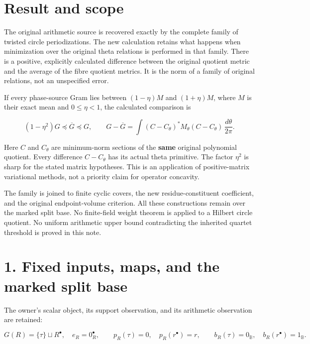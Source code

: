 


\section{Result and scope}\label{GraphV2:result-and-scope}

The original arithmetic source is recovered exactly by the complete
family of twisted circle periodizations. The new calculation retains
what happens when minimization over the original theta relations is
performed in that family. There is a positive, explicitly calculated
difference between the original quotient metric and the average of the
fibre quotient metrics. It is the norm of a family of original
relations, not an unspecified error.

If every phase-source Gram lies between \((1-\eta)M\) and \((1+\eta)M\),
where \(M\) is their exact mean and \(0\leq\eta<1\), the calculated
comparison is

\[
 (1-\eta^2)G\preceq \overline G\preceq G,
 \qquad
 G-\overline G
 =\int (C-C_\theta)^*M_\theta(C-C_\theta)\,\frac{d\theta}{2\pi}.
 \tag{H1}
\]

Here \(C\) and \(C_\theta\) are minimum-norm sections of the
\textbf{same} original polynomial quotient. Every difference
\(C-C_\theta\) has its actual theta primitive. The factor \(\eta^2\) is
sharp for the stated matrix hypotheses. This is an application of
positive-matrix variational methods, not a priority claim for operator
concavity.

The family is joined to finite cyclic covers, the new
residue-constituent coefficient, and the original endpoint-volume
criterion. All these constructions remain over the marked split base. No
finite-field weight theorem is applied to a Hilbert circle quotient. No
uniform arithmetic upper bound contradicting the inherited quartet
threshold is proved in this note.

\section{1. Fixed inputs, maps, and the marked split
base}\label{GraphV2:fixed-inputs-maps-and-the-marked-split-base}

The owner's scalar object, its support observation, and its arithmetic
observation are retained:

\[
 G(R)=\{\tau\}\sqcup R^\bullet,\quad e_R=0_R^\bullet,\qquad
 p_R(\tau)=0,\quad p_R(r^\bullet)=r,\qquad
 b_R(\tau)=0_{\mathbb B},\quad b_R(r^\bullet)=1_{\mathbb B}.
 \tag{H2}
\]

